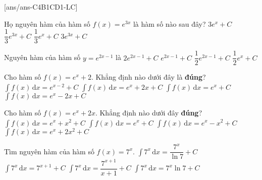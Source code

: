 [ans/ans-C4B1CD1-LC]
\begin{ex}%
	Họ nguyên hàm của hàm số $f(x)=e^{3x}$ là hàm số nào sau đây?
	\choice
	{$3e^x+C$}
	{\True $\dfrac{1}{3}e^{3x}+C$}
	{$\dfrac{1}{3}e^{x}+C$}
	{$3e^{3x}+C$}
\end{ex}

\begin{ex}%
	Nguyên hàm của hàm số $y=e^{2x-1}$  là
	\choice
	{$2e^{2x-1}+C$}
	{$e^{2x-1}+C$}
	{\True $\dfrac{1}{2}e^{2x-1}+C$}
	{$\dfrac{1}{2}e^{x}+C$}
\end{ex}

\begin{ex}%
	Cho hàm số $f(x)=e^x+2$. Khẳng định nào dưới đây là \textbf{đúng}?
	\choice
	{$\displaystyle\int f(x) \mathrm{\,d}x=e^{x-2}+C$}
	{\True $\displaystyle\int f(x) \mathrm{\,d}x=e^{x}+2x+C$}
	{$\displaystyle\int f(x) \mathrm{\,d}x=e^{x}+C$}
	{$\displaystyle\int f(x) \mathrm{\,d}x=e^{x}-2x+C$}
\end{ex}

\begin{ex}%
	Cho hàm số $f(x)=e^x+2x$. Khẳng định nào dưới đây \textbf{đúng}?
	\choice
	{\True $\displaystyle\int f(x) \mathrm{\,d}x=e^{x}+x^2+C$}
	{$\displaystyle\int f(x) \mathrm{\,d}x=e^{x}+C$}
	{$\displaystyle\int f(x) \mathrm{\,d}x=e^{x}-x^2+C$}
	{$\displaystyle\int f(x) \mathrm{\,d}x=e^{x}+2x^2+C$}
\end{ex}

\begin{ex}%
	Tìm nguyên hàm của hàm số  $f(x)=7^x$.
	\choice
	{\True $\displaystyle\int 7^x \mathrm{\,d}x=\dfrac{7^x}{\ln 7}+C$}
	{$\displaystyle\int 7^x \mathrm{\,d}x=7^{x+1}+C$}
	{$\displaystyle\int 7^x \mathrm{\,d}x=\dfrac{7^{x+1}}{x+1}+C$}
	{$\displaystyle\int 7^x \mathrm{\,d}x=7^x\ln 7+C$}
\end{ex}

